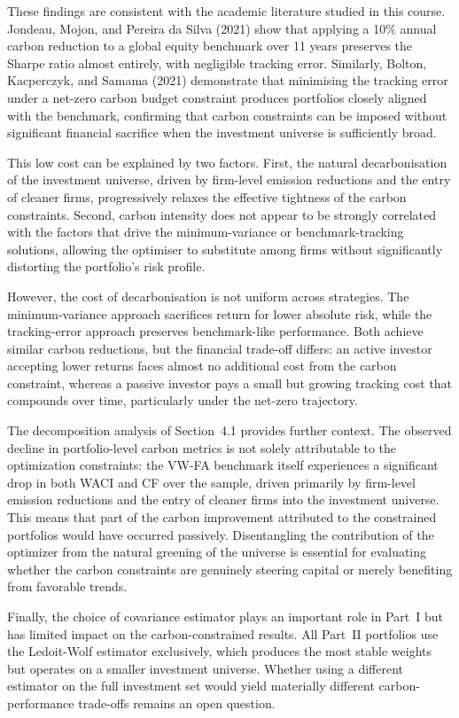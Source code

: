 \documentclass[11pt,a4paper]{article}
\begin{document}
These findings are consistent with the academic literature studied in this course. Jondeau, Mojon, and Pereira da Silva (2021) show that applying a 10\% annual carbon reduction to a global equity benchmark over 11 years preserves the Sharpe ratio almost entirely, with negligible tracking error. Similarly, Bolton, Kacperczyk, and Samama (2021) demonstrate that minimising the tracking error under a net-zero carbon budget constraint produces portfolios closely aligned with the benchmark, confirming that carbon constraints can be imposed without significant financial sacrifice when the investment universe is sufficiently broad.

This low cost can be explained by two factors. First, the natural decarbonisation of the investment universe, driven by firm-level emission reductions and the entry of cleaner firms, progressively relaxes the effective tightness of the carbon constraints. Second, carbon intensity does not appear to be strongly correlated with the factors that drive the minimum-variance or benchmark-tracking solutions, allowing the optimiser to substitute among firms without significantly distorting the portfolio's risk profile.

However, the cost of decarbonisation is not uniform across strategies. The minimum-variance approach sacrifices return for lower absolute risk, while the tracking-error approach preserves benchmark-like performance. Both achieve similar carbon reductions, but the financial trade-off differs: an active investor accepting lower returns faces almost no additional cost from the carbon constraint, whereas a passive investor pays a small but growing tracking cost that compounds over time, particularly under the net-zero trajectory.

The decomposition analysis of Section~4.1 provides further context. The observed decline in portfolio-level carbon metrics is not solely attributable to the optimization constraints: the VW-FA benchmark itself experiences a significant drop in both WACI and CF over the sample, driven primarily by firm-level emission reductions and the entry of cleaner firms into the investment universe. This means that part of the carbon improvement attributed to the constrained portfolios would have occurred passively. Disentangling the contribution of the optimizer from the natural greening of the universe is essential for evaluating whether the carbon constraints are genuinely steering capital or merely benefiting from favorable trends.

Finally, the choice of covariance estimator plays an important role in Part~I but has limited impact on the carbon-constrained results. All Part~II portfolios use the Ledoit-Wolf estimator exclusively, which produces the most stable weights but operates on a smaller investment universe. Whether using a different estimator on the full investment set would yield materially different carbon-performance trade-offs remains an open question.
\end{document}
